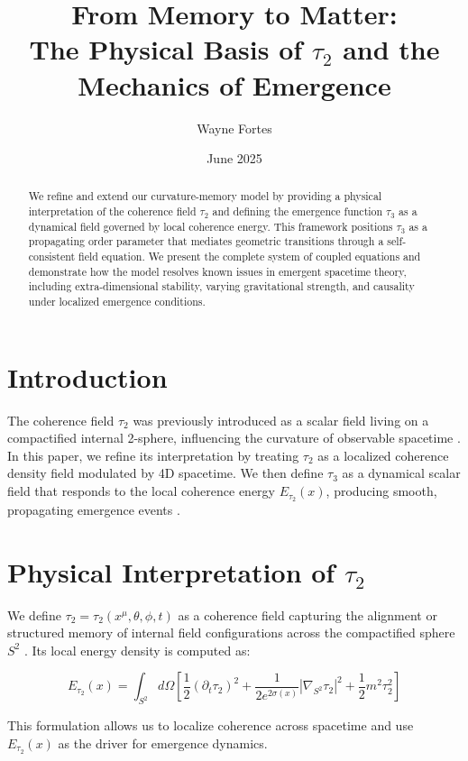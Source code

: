 \documentclass[12pt]{article}
\title{From Memory to Matter:\\The Physical Basis of $\tau_2$ and the Mechanics of Emergence}
\author{Wayne Fortes}
\date{June 2025}
\begin{document}
\maketitle

\begin{abstract}
We refine and extend our curvature-memory model by providing a physical interpretation of the coherence field $\tau_2$ and defining the emergence function $\tau_3$ as a dynamical field governed by local coherence energy. This framework positions $\tau_3$ as a propagating order parameter that mediates geometric transitions through a self-consistent field equation. We present the complete system of coupled equations and demonstrate how the model resolves known issues in emergent spacetime theory, including extra-dimensional stability, varying gravitational strength, and causality under localized emergence conditions.
\end{abstract}

\section{Introduction}

The coherence field $\tau_2$ was previously introduced as a scalar field living on a compactified internal 2-sphere, influencing the curvature of observable spacetime \cite{fortes2025a,fortes2025b}. In this paper, we refine its interpretation by treating $\tau_2$ as a localized coherence density field modulated by 4D spacetime. We then define $\tau_3$ as a dynamical scalar field that responds to the local coherence energy $E_{\tau_2}(x)$, producing smooth, propagating emergence events \cite{fortes2025c}.

\section{Physical Interpretation of $\tau_2$}

We define $\tau_2 = \tau_2(x^\mu, \theta, \phi, t)$ as a coherence field capturing the alignment or structured memory of internal field configurations across the compactified sphere $S^2$ \cite{raamsdonk2010}. Its local energy density is computed as:

\[
E_{\tau_2}(x) = \int_{S^2} d\Omega \left[
\frac{1}{2} (\partial_t \tau_2)^2 +
\frac{1}{2e^{2\sigma(x)}} |\nabla_{S^2} \tau_2|^2 +
\frac{1}{2} m^2 \tau_2^2
\right]
\]

This formulation allows us to localize coherence across spacetime and use $E_{\tau_2}(x)$ as the driver for emergence dynamics.
\end{document}
